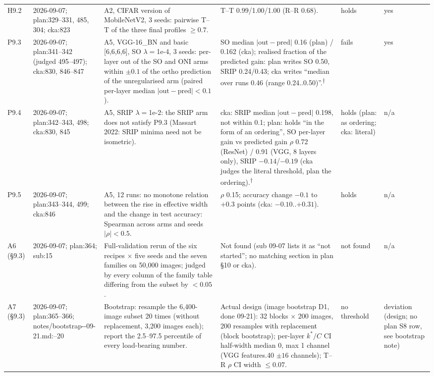 \begin{longtable}{p{1.1cm}p{1.4cm}p{6.2cm}p{4.6cm}p{2.0cm}p{1.6cm}}
H9.2 & 2026-09-07; plan:329--331, 485, 304; cka:823 & A2, CIFAR version of MobileNetV2, 3 seeds: pairwise T--T of the three final profiles $\ge 0.7$. & T--T 0.99/1.00/1.00 (R--R 0.68). & holds & yes \\
P9.3 & 2026-09-07; plan:341--342 (judged 495--497); cka:830, 846--847 & A5, VGG-16\_BN and basic [6,6,6,6], SO $\lambda=$1e-4, 3 seeds: per-layer out of the SO and ONI arms within $\pm 0.1$ of the ortho prediction of the unregularised arm (paired per-layer median $|\mathrm{out}-\mathrm{pred}| < 0.1$). & SO median $|\mathrm{out}-\mathrm{pred}|$ 0.16 (plan) / 0.162 (cka); realised fraction of the predicted gain: plan writes SO 0.50, SRIP 0.24/0.43; cka writes ``median over runs 0.46 (range 0.24..0.50)''.\textsuperscript{$\dagger$} & fails & yes \\
P9.4 & 2026-09-07; plan:342--343, 498; cka:830, 845 & A5, SRIP $\lambda=$1e-2: the SRIP arm does not satisfy P9.3 (Massart 2022: SRIP minima need not be isometric). & cka: SRIP median $|\mathrm{out}-\mathrm{pred}|$ 0.198, not within 0.1; plan: holds ``in the form of an ordering'', SO per-layer gain vs predicted gain $\rho$ 0.72 (ResNet) / 0.91 (VGG, 8 layers only), SRIP $-0.14$/$-0.19$ (cka judges the literal threshold, plan the ordering).\textsuperscript{$\dagger$} & holds (plan: as ordering; cka: literal) & n/a \\
P9.5 & 2026-09-07; plan:343--344, 499; cka:846 & A5, 12 runs: no monotone relation between the rise in effective width and the change in test accuracy: Spearman across arms and seeds $|\rho| < 0.5$. & $\rho$ 0.15; accuracy change $-0.1$ to $+0.3$ points (cka: $-0.10$..$+0.31$). & holds & n/a \\
A6 (\S9.3) & 2026-09-07; plan:364; sub:15 & Full-validation rerun of the six recipes $\times$ five seeds and the seven families on 50,000 images; judged by every column of the family table differing from the subset by $< 0.05$. & Not found (sub 09-07 lists it as ``not started''; no matching section in plan \S10 or cka). & not found & n/a \\
A7 (\S9.3) & 2026-09-07; plan:365--366; notes/\allowbreak bootstrap-\allowbreak 2026-09-21.md:\allowbreak 1--20 & Bootstrap: resample the 6,400-image subset 20 times (without replacement, 3,200 images each); report the 2.5--97.5 percentile of every load-bearing number. & Actual design (image bootstrap D1, done 09-21): 32 blocks $\times$ 200 images, 200 resamples with replacement (block bootstrap); per-layer $k^*/C$ CI half-width median 0, max 1 channel (VGG features.40 $\pm 16$ channels); T--R $\rho$ CI width $\le 0.07$. & no threshold & deviation (design; no plan S8 row, see bootstrap note) \\

\end{longtable}
